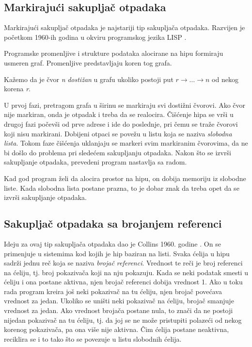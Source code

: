 \subsection{Markirajući sakupljač otpadaka}

Markirajući sakupljač otpadaka je najstariji tip sakupljača otpadaka. Razvijen je početkom 1960-ih godina u okviru programskog jezika LISP \cite{mcca60}.

Programske promenljive i strukture podataka alocirane na hipu formiraju usmeren graf. Promenljive predstavljaju koren tog grafa.

\begin{definicija}
	Kažemo da je čvor \textit{n} \textit{dostižan} u grafu ukoliko postoji put $r\rightarrow \dots \rightarrow n$ od nekog korena \textit{r}.
\end{definicija}

U prvoj fazi, pretragom grafa u širinu se markiraju svi dostižni čvorovi. Ako čvor nije markiran, onda je otpadak i treba da se realocira. Čišćenje hipa se vrši u drugoj fazi počevši od prve adrese i ide do poslednje, pri čemu se traže čvorovi koji nisu markirani. Dobijeni otpaci se povežu u listu koja se naziva \textit{slobodna lista}. Tokom faze čišćenja uklanjaju se markeri svim markiranim čvorovima, da ne bi došlo do problema pri sledećem sakupljanju otpadaka. Nakon što se izvrši sakupljanje otpadaka, prevedeni program nastavlja sa radom.

Kad god program želi da alocira prostor na hipu, on dobija memoriju iz slobodne liste. Kada slobodna lista postane prazna, to je dobar znak da treba opet da se izvrši sakupljanje otpadaka.

\subsection{Sakupljač otpadaka sa brojanjem referenci}
\label{ref:reference counter}

Ideju za ovaj tip sakupljača otpadaka dao je Collins 1960. godine \cite{col60}. On se primenjuje u sistemima kod kojih je hip baziran na listi. Svaka ćelija u hipu sadrži jednu reč koja se naziva \textit{brojač referenci}. Vrednost te reči je broj referenci na ćeliju, tj. broj pokazivača koji na nju pokazuju. Kada se neki podatak smesti u ćeliju i ona postane aktivna, njen brojač referenci dobija vrednost 1. Ako u toku rada program kreira još neki pokazivač na tu ćeliju, njen brojač povećava vrednost za jedan. Ukoliko se uništi neki pokazivač na ćeliju, brojač smanjuje vrednost za jedan. Ako vrednost brojača postane nula, to znači da ne postoji nijedan pokazivač na tu ćeliju, tj. da joj se ne može pristupiti polazeći od nekog korenog pokazivača, pa ona više nije aktivna. Čim ćelija postane neaktivna, reciklira se i to tako što se povezuje u listu slobodnih ćelija.

